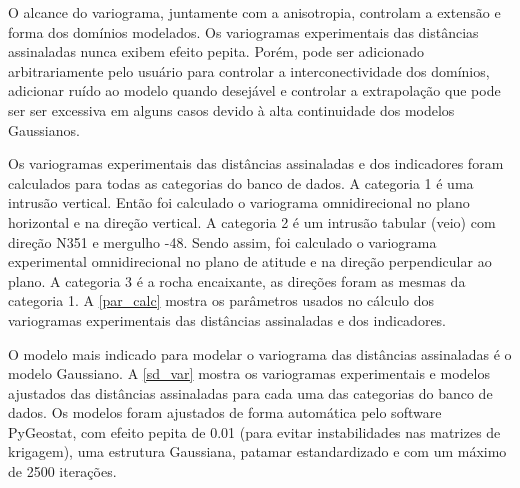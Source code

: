 O alcance do variograma, juntamente com a anisotropia, controlam a extensão e forma dos domínios modelados. Os variogramas experimentais das distâncias assinaladas nunca exibem efeito pepita. Porém, pode ser adicionado arbitrariamente pelo usuário para controlar a interconectividade dos domínios, adicionar ruído ao modelo quando desejável e controlar a extrapolação que pode ser ser excessiva em alguns casos devido à alta continuidade dos modelos Gaussianos.

Os variogramas experimentais das distâncias assinaladas e dos indicadores foram calculados para todas as categorias do banco de dados. A categoria 1 
é uma intrusão vertical. Então foi calculado o variograma omnidirecional no plano horizontal e na direção vertical. A categoria 2 é um intrusão tabular (veio) com direção N351 e mergulho -48. Sendo assim, foi calculado o variograma experimental omnidirecional no plano de atitude e na direção perpendicular ao plano. A categoria 3 é a rocha encaixante, as direções foram as mesmas da categoria 1. A \autoref{par_calc} mostra os parâmetros usados no cálculo dos variogramas experimentais das distâncias assinaladas e dos indicadores.

\begin{table}[]
\centering
{}
\caption{Parâmetros de cálculo dos variogramas experimentais.} \label{par_calc}
\end{table}

O modelo mais indicado para modelar o variograma das distâncias assinaladas é o modelo Gaussiano. A \autoref{sd_var} mostra os variogramas experimentais e modelos ajustados das distâncias assinaladas para cada uma das categorias do banco de dados. Os modelos foram ajustados de forma automática pelo software PyGeostat, com efeito pepita de 0.01 (para evitar instabilidades nas matrizes de krigagem), uma estrutura Gaussiana, patamar estandardizado e com um máximo de 2500 iterações.  

